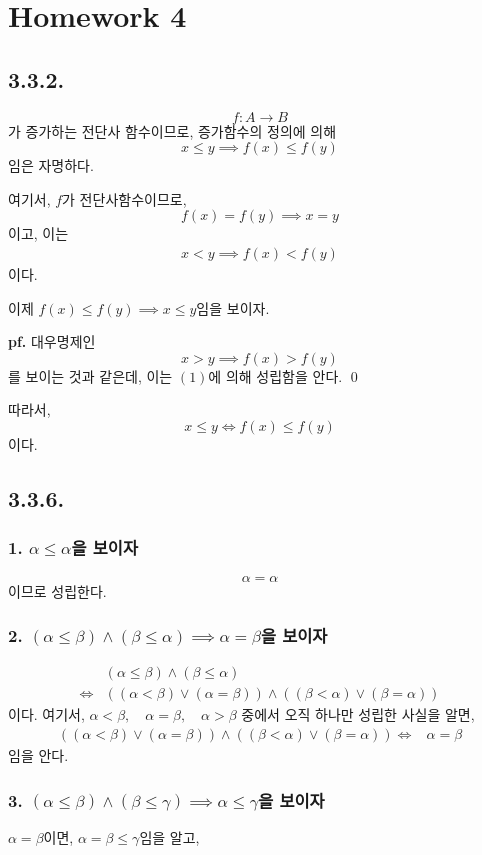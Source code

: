 \documentclass{article}
\begin{document}
\twocolumn

\chapter{Homework 4}

\section{3.3.2.}
$$f : A \rightarrow B$$가 증가하는 전단사 함수이므로, 증가함수의 정의에 의해
$$x \le y \implies f(x) \le f(y)$$
임은 자명하다.

여기서, $f$가 전단사함수이므로, 
$$f(x) = f(y) \implies x = y$$이고, 이는
\begin{align*}
x < y \implies f(x) < f(y) \tag{1}
\end{align*}
이다.

이제 $f(x) \le f(y) \implies x \le y$임을 보이자.

\textbf{pf.} 대우명제인
$$x > y \implies f(x) > f(y)$$를 보이는 것과 같은데,
이는 $(1)$에 의해 성립함을 안다. \qed

따라서, 
$$x \le y \iff f(x) \le f(y)$$이다.

\section{3.3.6.}
\subsection{1. $\alpha \le \alpha$을 보이자}
$$\alpha = \alpha$$이므로 성립한다.
\subsection{2. $(\alpha \le \beta) \wedge (\beta \le \alpha)  \implies \alpha = \beta$을 보이자}
\begin{align*}
&(\alpha \le \beta) \wedge (\beta \le \alpha) 
\\ \iff& ((\alpha < \beta) \vee (\alpha = \beta) ) \wedge ( (\beta < \alpha) \vee (\beta = \alpha))
\end{align*}
이다. 여기서, $\alpha < \beta,\quad \alpha = \beta,\quad \alpha > \beta$ 중에서 오직 하나만 성립한 사실을 알면,
\begin{align*}
((\alpha < \beta) \vee (\alpha = \beta) ) \wedge ( (\beta < \alpha) \vee (\beta = \alpha)) \iff & \alpha = \beta
\end{align*}
임을 안다.

\subsection{3. $(\alpha \le \beta) \wedge (\beta \le \gamma)  \implies \alpha \le \gamma$을 보이자}
$\alpha = \beta$이면, $\alpha = \beta \le \gamma$임을 알고,
\end{document}
